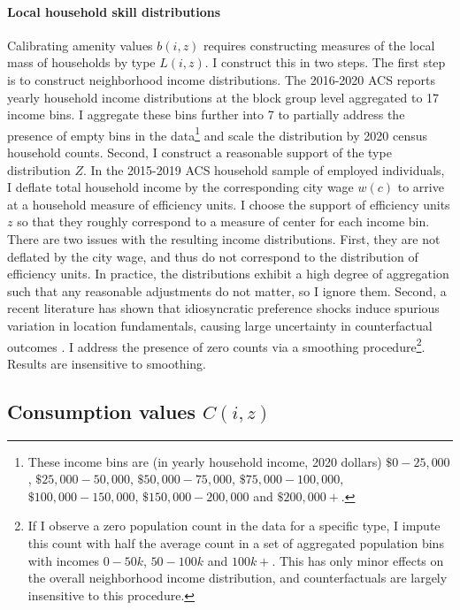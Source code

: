 \documentclass[12pt]{article}
\begin{document}
\paragraph*{Local household skill distributions}\label{Calibration:LocalType} Calibrating amenity values $b(i, z)$ requires constructing measures of the local mass of households by type $L(i, z)$. I construct this in two steps. The first step is to construct neighborhood income distributions. The 2016-2020 ACS reports yearly household income distributions at the block group level aggregated to 17 income bins. I aggregate these bins further into 7 to partially address the presence of empty bins in the data\footnote{These income bins are (in yearly household income, 2020 dollars) $\$0-25,000$, $\$25,000-50,000$, $\$50,000-75,000$, $\$75,000-100,000$, $\$100,000-150,000$, $\$150,000-200,000$ and $\$200,000+$.} and scale the distribution by 2020 census household counts. Second, I construct a reasonable support of the type distribution $Z$. In the 2015-2019 ACS household sample of employed individuals, I deflate total household income by the corresponding city wage $w(c)$ to arrive at a household measure of efficiency units. I choose the support of efficiency units $z$ so that they roughly correspond to a measure of center for each income bin. There are two issues with the resulting income distributions. First, they are not deflated by the city wage, and thus do not correspond to the distribution of efficiency units. In practice, the distributions exhibit a high degree of aggregation such that any reasonable adjustments do not matter, so I ignore them. Second, a recent literature has shown that idiosyncratic preference shocks induce spurious variation in location fundamentals, causing large uncertainty in counterfactual outcomes \citep{DingelTintelnot:2021}. I address the presence of zero counts via a smoothing procedure\footnote{If I observe a zero population count in the data for a specific type, I impute this count with half the average count in a set of aggregated population bins with incomes $0-50k$, $50-100k$ and $100k+$. This has only minor effects on the overall neighborhood income distribution, and counterfactuals are largely insensitive to this procedure.}. Results are insensitive to smoothing.

\subsection{Consumption values $C(i, z)$}\label{Calibration:Consumption}
\end{document}
